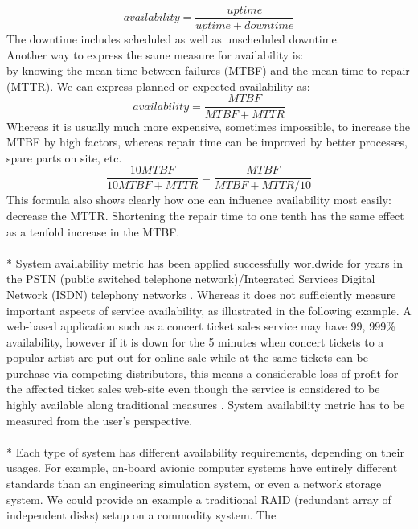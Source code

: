 \documentclass[english]{tktltiki2}
\theoremstyle{definition}
\theoremstyle{remark}
\begin{document}
 \begin{equation}
 availability =  \dfrac{uptime}{uptime + downtime}
 \end{equation}                                     
The downtime includes scheduled as well as unscheduled downtime.\\
Another way to express the same measure for availability is:\\ by knowing the mean time between failures (MTBF) and the mean time to repair (MTTR). We can express planned or expected availability as:
\begin{equation} \label{eq:2}
availability = \dfrac{MTBF}{MTBF + MTTR}
\end{equation}
Whereas it is usually much more expensive, sometimes impossible, to increase
the MTBF by high factors, whereas repair time can be improved by
better processes, spare parts on site, etc.
\begin{equation}
\dfrac{10MTBF}{10MTBF + MTTR} = \dfrac{MTBF}{MTBF + MTTR/10}
\end{equation}
This formula also shows clearly how one can influence availability most
easily: decrease the MTTR. Shortening the repair time to one tenth has
the same effect as a tenfold increase in the MTBF.\\ \\*
System availability metric has been applied successfully worldwide for years in the PSTN (public switched telephone network)/Integrated Services Digital Network (ISDN) telephony networks \cite{ProacMgmnt}. Whereas it does not sufficiently measure important aspects of service availability, as illustrated in the following example. A web-based application such as a concert ticket sales service may have 99, 999\% availability, however if it is down for the 5 minutes when concert tickets to a popular artist are put out for online sale while at the same tickets can be purchase via competing distributors, this means a considerable loss of profit for the affected ticket sales web-site even though the service is considered to be highly available along traditional measures \cite{Norv1}. System availability metric  has to be measured from the user’s perspective. \\ \\*
Each type of system has different availability requirements, depending on their usages. For example, on-board avionic computer systems have entirely different standards than an engineering simulation system, or even a network
storage system. We could provide an example a traditional RAID
(redundant array of independent disks) setup on a commodity system. The
\end{document}

